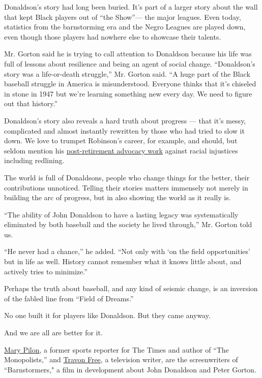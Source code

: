 Donaldson's story had long been buried. It's part of a larger story
about the wall that kept Black players out of ``the Show''--- the major
leagues. Even today, statistics from the barnstorming era and the Negro
Leagues are played down, even though those players had nowhere else to
showcase their talents.

Mr. Gorton said he is trying to call attention to Donaldson because his
life was full of lessons about resilience and being an agent of social
change. ``Donaldson's story was a life-or-death struggle,'' Mr. Gorton
said. ``A huge part of the Black baseball struggle in America is
misunderstood. Everyone thinks that it's chiseled in stone in 1947 but
we're learning something new every day. We need to figure out that
history.''

Donaldson's story also reveals a hard truth about progress --- that it's
messy, complicated and almost instantly rewritten by those who had tried
to slow it down. We love to trumpet Robinson's career, for example, and
should, but seldom mention his
\href{https://prospect.org/civil-rights/jackie-robinson-legacy-activism/}{post-retirement
advocacy work} against racial injustices including redlining.

The world is full of Donaldsons, people who change things for the
better, their contributions unnoticed. Telling their stories matters
immensely not merely in building the arc of progress, but in also
showing the world as it really is.

``The ability of John Donaldson to have a lasting legacy was
systematically eliminated by both baseball and the society he lived
through,'' Mr. Gorton told us.

``He never had a chance,'' he added. ``Not only with `on the field
opportunities' but in life as well. History cannot remember what it
knows little about, and actively tries to minimize.''

Perhaps the truth about baseball, and any kind of seismic change, is an
inversion of the fabled line from ``Field of Dreams.''

No one built it for players like Donaldson. But they came anyway.

And we are all are better for it.

\href{http://marypilon.com/}{Mary Pilon}, a former sports reporter for
The Times and author of ``The Monopolists,'' and
\href{https://www.travonfree.com/}{Travon Free}, a television writer,
are the screenwriters of ``Barnstormers," a film in development about
John Donaldson and Peter Gorton.

